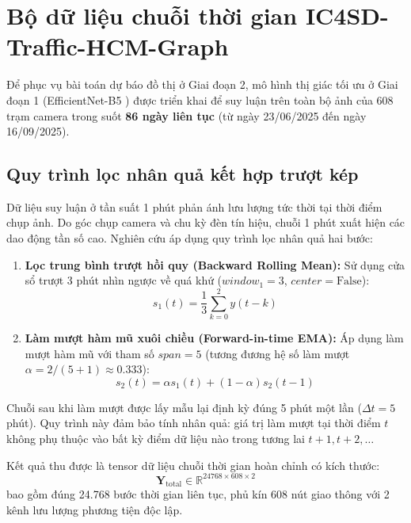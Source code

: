 \section{Bộ dữ liệu chuỗi thời gian IC4SD-Traffic-HCM-Graph}
\label{sec:du_lieu_graph}

Để phục vụ bài toán dự báo đồ thị ở Giai đoạn 2, mô hình thị giác tối ưu ở Giai đoạn 1 (EfficientNet-B5 \cite{efficientnet}) được triển khai để suy luận trên toàn bộ ảnh của 608 trạm camera trong suốt \textbf{86 ngày liên tục} (từ ngày 23/06/2025 đến ngày 16/09/2025). 

\subsection{Quy trình lọc nhân quả kết hợp trượt kép}
Dữ liệu suy luận ở tần suất 1 phút phản ánh lưu lượng tức thời tại thời điểm chụp ảnh. Do góc chụp camera và chu kỳ đèn tín hiệu, chuỗi 1 phút xuất hiện các dao động tần số cao. Nghiên cứu áp dụng quy trình lọc nhân quả hai bước:
\begin{enumerate}
    \item \textbf{Lọc trung bình trượt hồi quy (Backward Rolling Mean):} Sử dụng cửa sổ trượt 3 phút nhìn ngược về quá khứ ($window_1 = 3$, $center = \text{False}$):
    \begin{equation}
        s_{1}(t) = \frac{1}{3} \sum_{k=0}^{2} y(t - k)
    \end{equation}
    \item \textbf{Làm mượt hàm mũ xuôi chiều (Forward-in-time EMA):} Áp dụng làm mượt hàm mũ với tham số $span = 5$ (tương đương hệ số làm mượt $\alpha = 2/(5+1) \approx 0.333$):
    \begin{equation}
        s_{2}(t) = \alpha s_{1}(t) + (1 - \alpha) s_{2}(t - 1)
    \end{equation}
\end{enumerate}
Chuỗi sau khi làm mượt được lấy mẫu lại định kỳ đúng 5 phút một lần ($\Delta t = 5$ phút). Quy trình này đảm bảo tính nhân quả: giá trị làm mượt tại thời điểm $t$ không phụ thuộc vào bất kỳ điểm dữ liệu nào trong tương lai $t+1, t+2, \dots$

Kết quả thu được là tensor dữ liệu chuỗi thời gian hoàn chỉnh có kích thước:
\begin{equation}
    \mathbf{Y}_{\text{total}} \in \mathbb{R}^{24768 \times 608 \times 2}
\end{equation}
bao gồm đúng 24.768 bước thời gian liên tục, phủ kín 608 nút giao thông với 2 kênh lưu lượng phương tiện độc lập.

